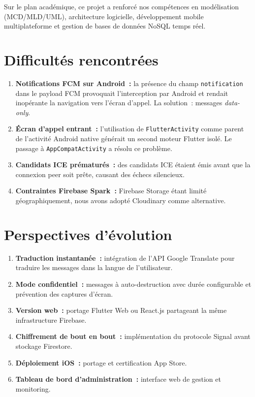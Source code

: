 \documentclass[12pt,a4paper]{report}
\begin{document}
Sur le plan académique, ce projet a renforcé nos compétences en modélisation (MCD/MLD/UML), architecture logicielle, développement mobile multiplateforme et gestion de bases de données NoSQL temps réel.

\section{Difficultés rencontrées}

\begin{enumerate}
  \item \textbf{Notifications FCM sur Android~:} la présence du champ \texttt{notification} dans le payload FCM provoquait l'interception par Android et rendait inopérante la navigation vers l'écran d'appel. La solution~: messages \textit{data-only}.
  \item \textbf{Écran d'appel entrant~:} l'utilisation de \texttt{FlutterActivity} comme parent de l'activité Android native générait un second moteur Flutter isolé. Le passage à \texttt{AppCompatActivity} a résolu ce problème.
  \item \textbf{Candidats ICE prématurés~:} des candidats ICE étaient émis avant que la connexion peer soit prête, causant des échecs silencieux.
  \item \textbf{Contraintes Firebase Spark~:} Firebase Storage étant limité géographiquement, nous avons adopté Cloudinary comme alternative.
\end{enumerate}

\section{Perspectives d'évolution}

\begin{enumerate}[leftmargin=1.5cm,label=\textbf{P\arabic*}]
  \item \textbf{Traduction instantanée~:} intégration de l'API Google Translate pour traduire les messages dans la langue de l'utilisateur.
  \item \textbf{Mode confidentiel~:} messages à auto-destruction avec durée configurable et prévention des captures d'écran.
  \item \textbf{Version web~:} portage Flutter Web ou React.js partageant la même infrastructure Firebase.
  \item \textbf{Chiffrement de bout en bout~:} implémentation du protocole Signal avant stockage Firestore.
  \item \textbf{Déploiement iOS~:} portage et certification App Store.
  \item \textbf{Tableau de bord d'administration~:} interface web de gestion et monitoring.
\end{enumerate}
\end{document}
